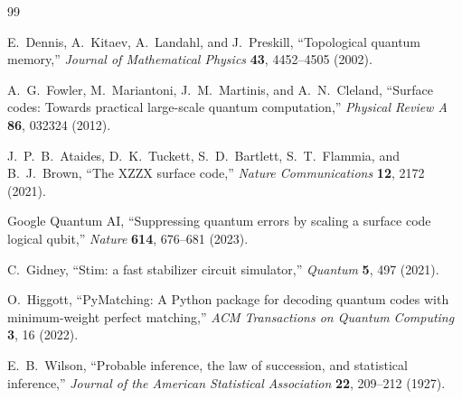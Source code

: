 \documentclass[11pt]{article}
\begin{document}
\begin{thebibliography}{99}

E.~Dennis, A.~Kitaev, A.~Landahl, and J.~Preskill,
``Topological quantum memory,''
\emph{Journal of Mathematical Physics} \textbf{43}, 4452--4505 (2002).

A.~G.~Fowler, M.~Mariantoni, J.~M.~Martinis, and A.~N.~Cleland,
``Surface codes: Towards practical large-scale quantum computation,''
\emph{Physical Review A} \textbf{86}, 032324 (2012).

J.~P.~B.~Ataides, D.~K.~Tuckett, S.~D.~Bartlett, S.~T.~Flammia, and B.~J.~Brown,
``The XZZX surface code,''
\emph{Nature Communications} \textbf{12}, 2172 (2021).

Google Quantum AI,
``Suppressing quantum errors by scaling a surface code logical qubit,''
\emph{Nature} \textbf{614}, 676--681 (2023).

C.~Gidney,
``Stim: a fast stabilizer circuit simulator,''
\emph{Quantum} \textbf{5}, 497 (2021).

O.~Higgott,
``PyMatching: A Python package for decoding quantum codes with minimum-weight perfect matching,''
\emph{ACM Transactions on Quantum Computing} \textbf{3}, 16 (2022).

E.~B.~Wilson,
``Probable inference, the law of succession, and statistical inference,''
\emph{Journal of the American Statistical Association} \textbf{22},
209--212 (1927).

\end{thebibliography}
\end{document}
